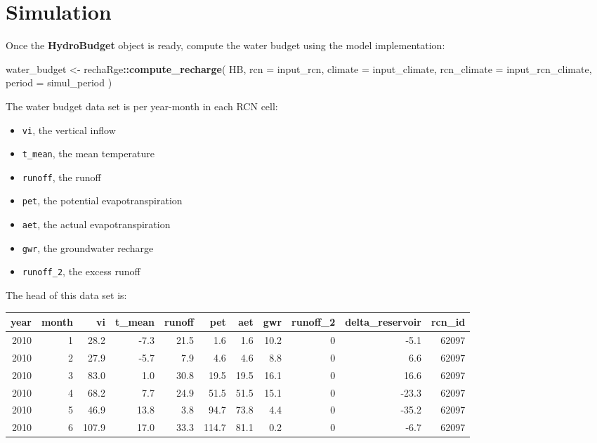 \documentclass[
]{book}
\newenvironment{Shaded}{\begin{snugshade}}{\end{snugshade}}
\newcommand{\AttributeTok}[1]{\textcolor[rgb]{0.13,0.29,0.53}{#1}}
\newcommand{\FunctionTok}[1]{\textcolor[rgb]{0.13,0.29,0.53}{\textbf{#1}}}
\newcommand{\NormalTok}[1]{#1}
\newcommand{\OtherTok}[1]{\textcolor[rgb]{0.56,0.35,0.01}{#1}}
\newcommand{\SpecialCharTok}[1]{\textcolor[rgb]{0.81,0.36,0.00}{\textbf{#1}}}
\providecommand{\tightlist}{%
  \setlength{\itemsep}{0pt}\setlength{\parskip}{0pt}}
\begin{document}
\hypertarget{simulation-1}{%
\section{Simulation}\label{simulation-1}}

Once the \textbf{HydroBudget} object is ready, compute the water budget using the model implementation:

\begin{Shaded}
\begin{Highlighting}[]
\NormalTok{water\_budget }\OtherTok{\textless{}{-}}\NormalTok{ rechaRge}\SpecialCharTok{::}\FunctionTok{compute\_recharge}\NormalTok{(}
\NormalTok{  HB,}
  \AttributeTok{rcn =}\NormalTok{ input\_rcn,}
  \AttributeTok{climate =}\NormalTok{ input\_climate,}
  \AttributeTok{rcn\_climate =}\NormalTok{ input\_rcn\_climate,}
  \AttributeTok{period =}\NormalTok{ simul\_period}
\NormalTok{)}
\end{Highlighting}
\end{Shaded}

The water budget data set is per year-month in each RCN cell:

\begin{itemize}
\tightlist
\item
  \texttt{vi}, the vertical inflow
\item
  \texttt{t\_mean}, the mean temperature
\item
  \texttt{runoff}, the runoff
\item
  \texttt{pet}, the potential evapotranspiration
\item
  \texttt{aet}, the actual evapotranspiration
\item
  \texttt{gwr}, the groundwater recharge
\item
  \texttt{runoff\_2}, the excess runoff
\end{itemize}

The head of this data set is:

\begin{tabular}{r|r|r|r|r|r|r|r|r|r|r}
\hline
year & month & vi & t\_mean & runoff & pet & aet & gwr & runoff\_2 & delta\_reservoir & rcn\_id\\
\hline
2010 & 1 & 28.2 & -7.3 & 21.5 & 1.6 & 1.6 & 10.2 & 0 & -5.1 & 62097\\
\hline
2010 & 2 & 27.9 & -5.7 & 7.9 & 4.6 & 4.6 & 8.8 & 0 & 6.6 & 62097\\
\hline
2010 & 3 & 83.0 & 1.0 & 30.8 & 19.5 & 19.5 & 16.1 & 0 & 16.6 & 62097\\
\hline
2010 & 4 & 68.2 & 7.7 & 24.9 & 51.5 & 51.5 & 15.1 & 0 & -23.3 & 62097\\
\hline
2010 & 5 & 46.9 & 13.8 & 3.8 & 94.7 & 73.8 & 4.4 & 0 & -35.2 & 62097\\
\hline
2010 & 6 & 107.9 & 17.0 & 33.3 & 114.7 & 81.1 & 0.2 & 0 & -6.7 & 62097\\
\hline
\end{tabular}
\end{document}
